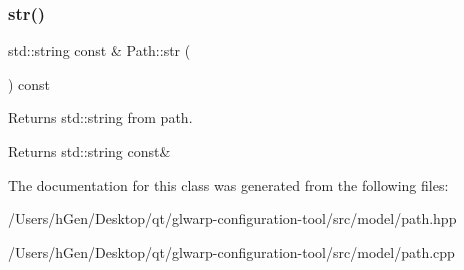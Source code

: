 \subsubsection{\texorpdfstring{str()}{str()}}
{\footnotesize\ttfamily std\+::string const  \& Path\+::str (\begin{DoxyParamCaption}{ }\end{DoxyParamCaption}) const}

Returns std\+::string from path. \begin{DoxyReturn}{Returns}
std\+::string const\& 
\end{DoxyReturn}


The documentation for this class was generated from the following files\+:\begin{DoxyCompactItemize}
\item 
/\+Users/h\+Gen/\+Desktop/qt/glwarp-\/configuration-\/tool/src/model/path.\+hpp\item 
/\+Users/h\+Gen/\+Desktop/qt/glwarp-\/configuration-\/tool/src/model/path.\+cpp\end{DoxyCompactItemize}
